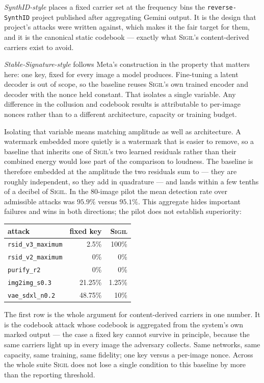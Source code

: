 \documentclass[10pt,twocolumn]{article}
\theoremstyle{definition}
\theoremstyle{remark}
\newcommand{\sigil}{\textsc{Sigil}}
\begin{document}
\emph{SynthID-style} places a fixed carrier set at the frequency bins the
\texttt{reverse-SynthID} project published after aggregating Gemini output. It
is the design that project's attacks were written against, which makes it the
fair target for them, and it is the canonical static codebook --- exactly what
\sigil{}'s content-derived carriers exist to avoid.

\emph{Stable-Signature-style} follows Meta's construction in the property that
matters here: one key, fixed for every image a model produces. Fine-tuning a
latent decoder is out of scope, so the baseline reuses \sigil{}'s own trained
encoder and decoder with the nonce held constant. That isolates a single
variable. Any difference in the collusion and codebook results is attributable
to per-image nonces rather than to a different architecture, capacity or
training budget.

Isolating that variable means matching amplitude as well as architecture. A
watermark embedded more quietly is a watermark that is easier to remove, so a
baseline that inherits one of \sigil{}'s two learned residuals rather than their
combined energy would lose part of the comparison to loudness. The baseline is
therefore embedded at the amplitude the two residuals sum to --- they are
roughly independent, so they add in quadrature --- and lands within a few tenths
of a decibel of \sigil{}. In the 80-image pilot the mean detection rate over
admissible attacks was $95.9\%$ versus $95.1\%$. This aggregate hides important
failures and wins in both directions; the pilot does not establish superiority:

\begin{center}\small
\begin{tabular}{lrr}
\toprule
attack & fixed key & \sigil{} \\
\midrule
\texttt{rsid\_v3\_maximum} & 2.5\% & 100\% \\
\texttt{rsid\_v2\_maximum} & 0\% & 0\% \\
\texttt{purify\_r2} & 0\% & 0\% \\
\texttt{img2img\_s0.3} & 21.25\% & 1.25\% \\
\texttt{vae\_sdxl\_n0.2} & 48.75\% & 10\% \\
\bottomrule
\end{tabular}
\end{center}

The first row is the whole argument for content-derived carriers in one number.
It is the codebook attack whose codebook is aggregated from the system's own
marked output --- the case a fixed key cannot survive in principle, because the
same carriers light up in every image the adversary collects. Same networks,
same capacity, same training, same fidelity; one key versus a per-image nonce.
Across the whole suite \sigil{} does not lose a single condition to this
baseline by more than the reporting threshold.
\end{document}
